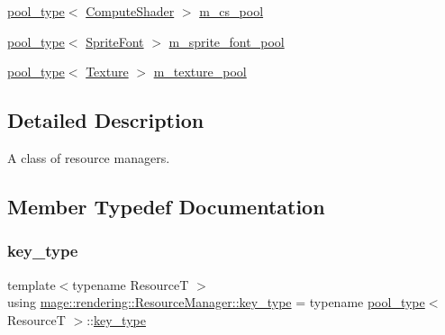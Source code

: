 \begin{DoxyCompactItemize}
\hyperlink{classmage_1_1rendering_1_1_resource_manager_ab21a4e280087032ee533f267bd9bf602}{pool\+\_\+type}$<$ \hyperlink{namespacemage_1_1rendering_aa67e55ba4dca44d39b0367b31f091863}{Compute\+Shader} $>$ \hyperlink{classmage_1_1rendering_1_1_resource_manager_ae0433b0866f523c3c0e6e22197aea86f}{m\+\_\+cs\+\_\+pool}
\item 
\hyperlink{classmage_1_1rendering_1_1_resource_manager_ab21a4e280087032ee533f267bd9bf602}{pool\+\_\+type}$<$ \hyperlink{classmage_1_1rendering_1_1_sprite_font}{Sprite\+Font} $>$ \hyperlink{classmage_1_1rendering_1_1_resource_manager_a0319ef8aad59a69098e6c0a89b6c912e}{m\+\_\+sprite\+\_\+font\+\_\+pool}
\item 
\hyperlink{classmage_1_1rendering_1_1_resource_manager_ab21a4e280087032ee533f267bd9bf602}{pool\+\_\+type}$<$ \hyperlink{classmage_1_1rendering_1_1_texture}{Texture} $>$ \hyperlink{classmage_1_1rendering_1_1_resource_manager_aaf5faede84cdce3bd2589936d5ba3b18}{m\+\_\+texture\+\_\+pool}
\end{DoxyCompactItemize}


\subsection{Detailed Description}
A class of resource managers. 

\subsection{Member Typedef Documentation}
\hypertarget{classmage_1_1rendering_1_1_resource_manager_a097b505b275b411e02c73d1899e91a44}{}\label{classmage_1_1rendering_1_1_resource_manager_a097b505b275b411e02c73d1899e91a44} 
\subsubsection{\texorpdfstring{key\+\_\+type}{key\_type}}
{\footnotesize\ttfamily template$<$typename ResourceT $>$ \\
using \hyperlink{classmage_1_1rendering_1_1_resource_manager_a097b505b275b411e02c73d1899e91a44}{mage\+::rendering\+::\+Resource\+Manager\+::key\+\_\+type} =  typename \hyperlink{classmage_1_1rendering_1_1_resource_manager_ab21a4e280087032ee533f267bd9bf602}{pool\+\_\+type}$<$ ResourceT $>$\+::\hyperlink{classmage_1_1rendering_1_1_resource_manager_a097b505b275b411e02c73d1899e91a44}{key\+\_\+type}}

